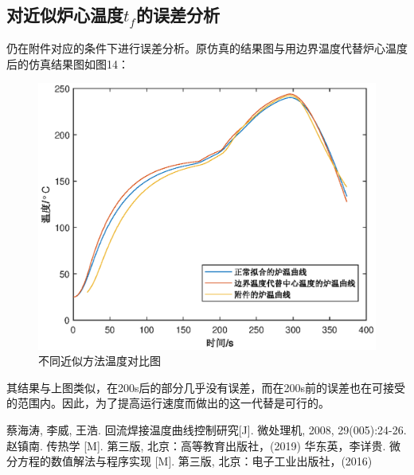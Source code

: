 \documentclass[a4paper,12pt]{ctexart} %
\begin{document}
	\subsection{对近似炉心温度$t_f$的误差分析}
	仍在附件对应的条件下进行误差分析。原仿真的结果图与用边界温度代替炉心温度后的仿真结果图如图14：
	\begin{figure}[H]
		\centering
		\includegraphics[scale=0.7]{ex_2}
		\caption{不同近似方法温度对比图}
	\end{figure}\par
	其结果与上图类似，在200s后的部分几乎没有误差，而在200s前的误差也在可接受的范围内。因此，为了提高运行速度而做出的这一代替是可行的。
	\begin{thebibliography}{9}%
		蔡海涛, 李威, 王浩. 回流焊接温度曲线控制研究[J]. 微处理机, 2008, 29(005):24-26.
		赵镇南. 传热学 [M]. 第三版, 北京：高等教育出版社，(2019)  
		华东英，李详贵. 微分方程的数值解法与程序实现 [M]. 第三版, 北京：电子工业出版社，(2016)  
	\end{thebibliography}
	
\end{document}
